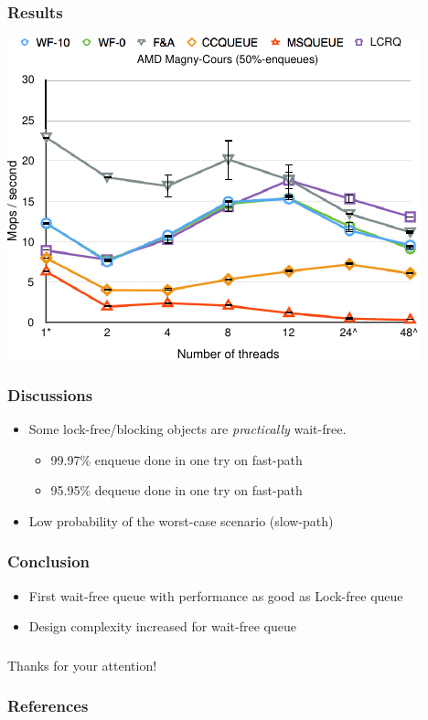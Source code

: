 \documentclass[10pt,a4paper]{beamer}
\begin{document}
\begin{frame}
  \frametitle{Results}
  \center
  \includegraphics[scale=1.3]{../synthese/img/courbe.pdf}
\end{frame}

\begin{frame}
  \frametitle{Discussions}
  \begin{itemize}
  \item[] Some lock-free/blocking objects are \textit{practically} wait-free.
    \medskip
  \begin{itemize}
  \item 99.97\% enqueue done in one try on fast-path \medskip
  \item 95.95\% dequeue done in one try on fast-path
  \end{itemize}
  \vfill
  \item[] Low probability of the worst-case scenario (slow-path)
  \end{itemize}
\end{frame}

\begin{frame}
  \frametitle{Conclusion}
  \begin{itemize}
  \item First wait-free queue with performance as good as Lock-free queue \vfill
  \item Design complexity increased for wait-free queue \vfill
\end{itemize}
\end{frame}

\begin{frame}
  \frametitle{}
  \LARGE \vfill \center Thanks for your attention! \vfill
\end{frame}

\begin{frame}[allowframebreaks]
 \frametitle{References}
 \nocite{*}
 \printbibliography
\end{frame}
\end{document}
